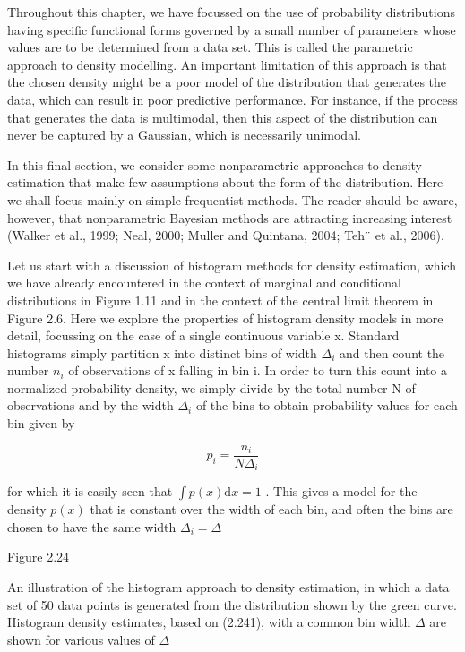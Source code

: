 \documentclass[
  10
]{article}
\begin{document}
Throughout this chapter, we have focussed on the use of probability
distributions having specific functional forms governed by a small
number of parameters whose values are to be determined from a data set.
This is called the parametric approach to density modelling. An
important limitation of this approach is that the chosen density might
be a poor model of the distribution that generates the data, which can
result in poor predictive performance. For instance, if the process that
generates the data is multimodal, then this aspect of the distribution
can never be captured by a Gaussian, which is necessarily unimodal.

In this final section, we consider some nonparametric approaches to
density estimation that make few assumptions about the form of the
distribution. Here we shall focus mainly on simple frequentist methods.
The reader should be aware, however, that nonparametric Bayesian methods
are attracting increasing interest (Walker et al., 1999; Neal, 2000;
Muller and Quintana, 2004; Teh¨ et al., 2006).

Let us start with a discussion of histogram methods for density
estimation, which we have already encountered in the context of marginal
and conditional distributions in Figure 1.11 and in the context of the
central limit theorem in Figure 2.6. Here we explore the properties of
histogram density models in more detail, focussing on the case of a
single continuous variable x. Standard histograms simply partition x
into distinct bins of width \(\Delta _ { i }\) and then count the number
\(n _ { i }\) of observations of x falling in bin i. In order to turn
this count into a normalized probability density, we simply divide by
the total number N of observations and by the width \(\Delta _ { i }\)
of the bins to obtain probability values for each bin given by

\[
p _ {i} = \frac {n _ {i}}{N \Delta_ {i}}\tag{2.241}
\]

for which it is easily seen that
\(\textstyle \int p ( x ) \mathrm { d } x = 1\) . This gives a model for
the density \(p ( x )\) that is constant over the width of each bin, and
often the bins are chosen to have the same width
\(\Delta _ { i } = \Delta\)

Figure 2.24

An illustration of the histogram approach to density estimation, in
which a data set of 50 data points is generated from the distribution
shown by the green curve. Histogram density estimates, based on (2.241),
with a common bin width \(\Delta\) are shown for various values of
\(\Delta\)
\end{document}
